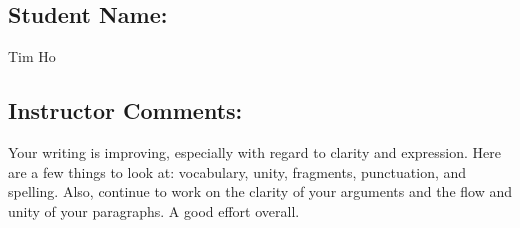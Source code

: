 \documentclass[letterpaper,10pt,DIV=9,headsepline]{scrreprt}
\begin{document}
\subsection{Student Name:}

Tim Ho

\subsection{Instructor Comments:}
Your writing is improving, especially with regard to clarity and
expression. Here are a few things to look at: vocabulary, unity,
fragments, punctuation, and spelling. Also, continue to work on the
clarity of your arguments and the flow and unity of your paragraphs. A
good effort overall.
\end{document}

